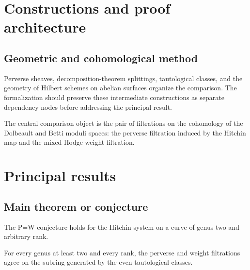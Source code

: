 \chapter{Constructions and proof architecture}
\label{chap:hitchin-fibrations-abelian-surfaces-pw-method}

\section{Geometric and cohomological method}
\label{sec:hitchin-fibrations-abelian-surfaces-pw-method}

Perverse sheaves, decomposition-theorem splittings, tautological classes, and the geometry of Hilbert schemes on abelian surfaces organize the comparison. The formalization should preserve these intermediate constructions
as separate dependency nodes before addressing the principal result.

\begin{definition}
\label{hitchin-fibrations-abelian-surfaces-pw-central-object}
The central comparison object is the pair of filtrations on the cohomology of the Dolbeault and Betti moduli spaces: the perverse filtration induced by the Hitchin map and the mixed-Hodge weight filtration.
\notready
\end{definition}

\chapter{Principal results}
\label{chap:hitchin-fibrations-abelian-surfaces-pw-results}

\section{Main theorem or conjecture}
\label{sec:hitchin-fibrations-abelian-surfaces-pw-results}

\begin{theorem}[Genus-two P=W]
\label{hitchin-fibrations-abelian-surfaces-pw-main}
The P=W conjecture holds for the Hitchin system on a curve of genus two and arbitrary rank.
\notready
\end{theorem}

\begin{theorem}[Tautological P=W]
\label{hitchin-fibrations-abelian-surfaces-pw-secondary}
For every genus at least two and every rank, the perverse and weight filtrations agree on the subring generated by the even tautological classes.
\notready
\end{theorem}
